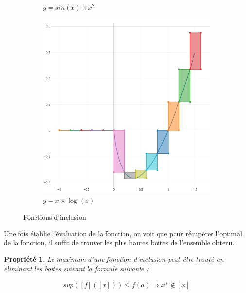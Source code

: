 \documentclass[12pt,a4paper]{article}
\newtheorem{prop}{Propriété}
\begin{document}
\begin{figure}[H]
\begin{subfigure}[h]{0.3\textwidth}
            \caption{$y = sin(x) \times x^2$}
            \label{fig:sinx_sqrx}
        \end{subfigure}
        \begin{subfigure}[h]{0.3\textwidth}
            \centering
            \includegraphics[scale=0.14]{xlog.png}
            \caption{$y = x\times\log(x)$}
            \label{fig:xlog}
        \end{subfigure}
        \caption{Fonctions d'inclusion}
    \end{figure}

    \medbreak
    Une fois établie l'évaluation de la fonction, on voit que pour récupérer l'optimal de la fonction, il suffit de trouver les plus hautes boites de l'ensemble obtenu.

    \begin{prop}
        Le maximum d'une fonction d'inclusion peut être trouvé en éliminant les boites suivant la formule suivante : 

        \begin{align}
            sup([f]([x])) \leq f(a) \Rightarrow x* \notin [x]
        \end{align}
    \end{prop}
\end{document}
